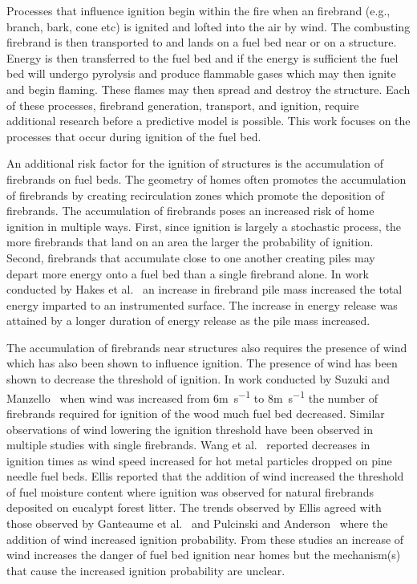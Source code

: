     Processes that influence ignition begin within the fire when an firebrand (e.g., branch, bark, cone etc) is ignited and lofted into the air by wind. The combusting firebrand is then transported to and lands on a fuel bed near or on a structure. Energy is then transferred to the fuel bed and if the energy is sufficient the fuel bed will undergo pyrolysis and produce flammable gases which may then ignite and begin flaming. These flames may then spread and destroy the structure. Each of these processes, firebrand generation, transport, and ignition, require additional research before a predictive model is possible. This work focuses on the processes that occur during ignition of the fuel bed.
    
    An additional risk factor for the ignition of structures is the accumulation of firebrands on fuel beds. The geometry of homes often promotes the accumulation of firebrands by creating recirculation zones which promote the deposition of firebrands. The accumulation of firebrands poses an increased risk of home ignition in multiple ways. First, since ignition is largely a stochastic process, the more firebrands that land on an area the larger the probability of ignition. Second, firebrands that accumulate close to one another creating piles may depart more energy onto a fuel bed than a single firebrand alone. In work conducted by Hakes et al.~\cite{Hakes2019a} an increase in firebrand pile mass increased the total energy imparted to an instrumented surface. The increase in energy release was attained by a longer duration of energy release as the pile mass increased.
    
    The accumulation of firebrands near structures also requires the presence of wind which has also been shown to influence ignition. The presence of wind has been shown to decrease the threshold of ignition. In work conducted by Suzuki and Manzello~\cite{Suzuki2020a} when wind was increased from 6\si{\meter\per\second} to 8\si{\meter\per\second} the number of firebrands required for ignition of the wood much fuel bed decreased. Similar observations of wind lowering the ignition threshold have been observed in multiple studies with single firebrands. Wang et al.~\cite{Wang2017} reported decreases in ignition times as wind speed increased for hot metal particles dropped on pine needle fuel beds. Ellis reported that the addition of wind increased the threshold of fuel moisture content where ignition was observed for natural firebrands  deposited on eucalypt forest litter. The trends observed by Ellis agreed with those observed by Ganteaume et al.~\cite{Ganteaume2009} and Pulcinski and Anderson~\cite{Plucinski2008} where the addition of wind increased ignition probability. From these studies an increase of wind increases the danger of fuel bed ignition near homes but the mechanism(s) that cause the increased ignition probability are unclear. 
    
